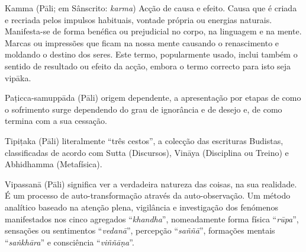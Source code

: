 \begin{glossarydescription}
\item[Kamma] (Pāli; em Sânscrito: \emph{karma}) Acção de causa e efeito. Causa que é
  criada e recriada pelos impulsos habituais, vontade própria ou energias
  naturais. Manifesta-se de forma benéfica ou prejudicial no corpo, na linguagem
  e na mente. Marcas ou impressões que ficam na nossa mente causando o
  renascimento e moldando o destino dos seres. Este termo, popularmente usado,
  inclui também o sentido de resultado ou efeito da acção, embora o termo
  correcto para isto seja vipāka.






\item[Paṭicca-samuppāda] (Pāli) origem dependente, a apresentação por etapas de
  como o sofrimento surge dependendo do grau de ignorância e de desejo e, de
  como termina com a sua cessação.





\item[Tipiṭaka] (Pāli) literalmente “três cestos”, a colecção das escrituras
  Budistas, classificadas de acordo com Sutta (Discursos), Vināya (Disciplina ou
  Treino) e Abhidhamma (Metafísica).



\item[Vipassanā] (Pāli) significa ver a verdadeira natureza das coisas, na sua
  realidade. É um processo de auto-transformação através da auto-observação. Um
  método analítico baseado na atenção plena, vigilância e investigação dos
  fenómenos manifestados nos cinco agregados “\emph{khandha}”, nomeadamente
  forma física “\emph{rūpa}”, sensações ou sentimentos “\emph{vedanā}”,
  percepção “\emph{saññā}”, formações mentais “\emph{saṅkhāra}” e consciência
  “\emph{viññāṇa}”.


\end{glossarydescription}

